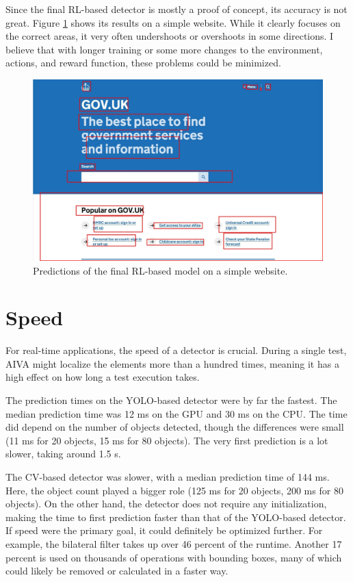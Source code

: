 \documentclass[
  digital,     %
  oneside,     %
  nosansbold,  %
  nocolorbold, %
  lof,         %
  lot,         %
]{fithesis4}
\begin{document}
Since the final RL-based detector is mostly a proof of concept, its accuracy is not great. Figure \ref{fig:gov_predict_rl} shows its results on a simple website. While it clearly focuses on the correct areas, it very often undershoots or overshoots in some directions. I believe that with longer training or some more changes to the environment, actions, and reward function, these problems could be minimized.

\begin{figure}
    \centering
    \includegraphics[width=1\linewidth]{results/rl_pred_gov.jpg}
    \caption{Predictions of the final RL-based model on a simple website.}
    \label{fig:gov_predict_rl}
\end{figure}

\section{Speed}

For real-time applications, the speed of a detector is crucial. During a single test, AIVA might localize the elements more than a hundred times, meaning it has a high effect on how long a test execution takes.

The prediction times on the YOLO-based detector were by far the fastest. The median prediction time was 12 ms on the GPU and 30 ms on the CPU. The time did depend on the number of objects detected, though the differences were small (11 ms for 20 objects, 15 ms for 80 objects). The very first prediction is a lot slower, taking around 1.5 s.

The CV-based detector was slower, with a median prediction time of 144 ms. Here, the object count played a bigger role (125 ms for 20 objects, 200 ms for 80 objects). On the other hand, the detector does not require any initialization, making the time to first prediction faster than that of the YOLO-based detector. If speed were the primary goal, it could definitely be optimized further. For example, the bilateral filter takes up over 46 percent of the runtime. Another 17 percent is used on thousands of operations with bounding boxes, many of which could likely be removed or calculated in a faster way.
\end{document}
